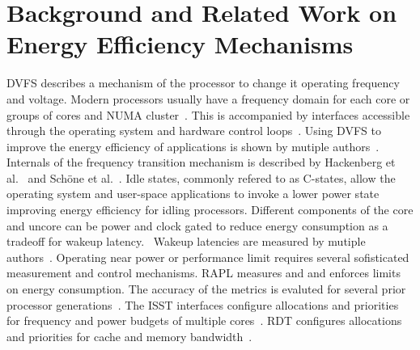 \chapter{Background and Related Work on Energy Efficiency Mechanisms}
\label{sec:background}

\ac{DVFS} describes a mechanism of the processor to change it operating frequency and voltage.
Modern processors usually have a frequency domain for each core or groups of cores and  \ac{NUMA} cluster~\cite{Intel_2017_Skylake_SP,Schoene_2024_Alder_Lake,Schoene_2021_Zen2}.
This is accompanied by interfaces accessible through the operating system and hardware control loops~\cite{intel_pstate_kernel_doc,Kernel_IntelSpeedSelect}.
Using \ac{DVFS} to improve the energy efficiency of applications is shown by mutiple authors~\cite{Gocht_2019_QLearning,Vysocky_2018_HPCTuning}.
Internals of the frequency transition mechanism is described by Hackenberg et al.~\cite{Hackenberg_2015_Haswell} and Schöne et al.~\cite{Intel_2017_Skylake_SP,Schoene_2021_Zen2,Schoene_2024_Alder_Lake}.
Idle states, commonly refered to as C-states, allow the operating system and user-space applications to invoke a lower power state improving energy efficiency for idling processors.
Different components of the core and uncore can be power and clock gated to reduce energy consumption as a tradeoff for wakeup latency.~\cite{Intel_PowerManagementTechnologyReviewIceLake,Kuns_2025_UserSpaceIdle}
Wakeup latencies are measured by mutiple authors~\cite{Hackenberg_2015_Haswell,Intel_2017_Skylake_SP,Schoene_2021_Zen2,Schoene_2024_Alder_Lake,Smejkal_2024_SleepWell}.
Operating near power or performance limit requires several sofisticated measurement and control mechanisms.
\ac{RAPL} measures and and enforces limits on energy consumption.
The accuracy of the metrics is evaluted for several prior processor generations~\cite{Haehnel_2012_RAPL,Hackenberg_2015_Haswell,Intel_2017_Skylake_SP,AMD_Zen2_Overview,Schoene_2024_Alder_Lake}.
The \ac{ISST} interfaces configure allocations and priorities for frequency and power budgets of multiple cores~\cite{Kernel_IntelSpeedSelect,Intel_2021_HPM}.
\ac{RDT} configures allocations and priorities for cache and memory bandwidth~\cite{Sohal_2022_RDT,Intel_2021_HPM}.
